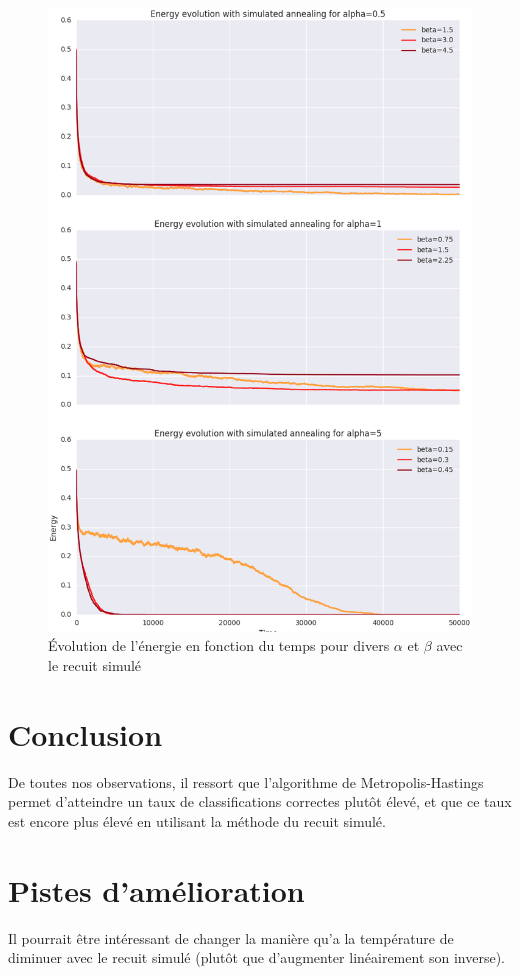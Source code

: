 \documentclass[twocolumn]{article}
\begin{document}
		\begin{figure}
		\includegraphics[width=\columnwidth]{../tobekept/ex1_sim_1683536997971113732-r.png}
		\caption{\label{ex1sim}Évolution de l'énergie en fonction du temps pour divers $\alpha$ et $\beta$ avec le recuit simulé}
		\end{figure}
		
	\section{Conclusion}
		De toutes nos observations, il ressort que l'algorithme de Metropolis-Hastings permet d'atteindre un taux de classifications correctes plutôt élevé, et que ce taux est encore plus élevé en utilisant la méthode du recuit simulé.
		
	\section{Pistes d'amélioration}
		Il pourrait être intéressant de changer la manière qu'a la température de diminuer avec le recuit simulé (plutôt que d'augmenter linéairement son inverse).
		
\end{document}
